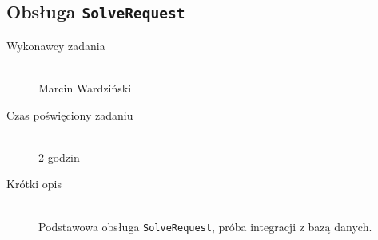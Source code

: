 \documentclass[a4paper]{article}
\begin{document}
\subsection{Obsługa \texttt{SolveRequest}}
\begin{description}
    \item[Wykonawcy zadania] \hfill \\ Marcin Wardziński
    \item[Czas poświęciony zadaniu] \hfill \\ 2 godzin
    \item[Krótki opis] \hfill \\ Podstawowa obsługa \texttt{SolveRequest}, próba integracji z bazą danych.
\end{description}
   
\end{document}
